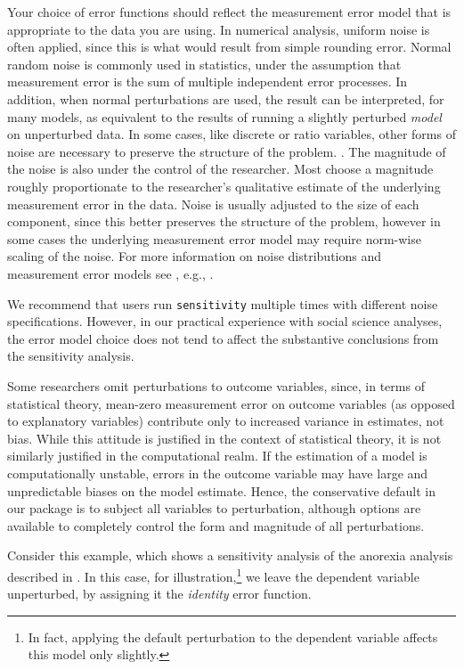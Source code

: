 \documentclass[11pt]{article}
\let\code=\texttt
\begin{document}
Your choice of error functions should reflect the measurement error model that is appropriate to the 
data you are using. In numerical analysis, uniform noise is often applied, since this is what would result from simple rounding error. Normal random noise is commonly used in statistics,
under the assumption that measurement error is the sum of multiple independent error processes. In 
addition, when normal perturbations are used, the result can be interpreted, for many models, as equivalent
to the results of running a slightly perturbed \emph{model} on unperturbed data. In some cases,
like discrete or ratio variables, other forms of noise are necessary to preserve
the structure of the problem. \citep[see, for example][section 16.3]{AltGilMcD03}. 
The magnitude of the noise is also under the control of the researcher. Most
choose a magnitude roughly proportionate to the researcher's qualitative estimate of the underlying measurement error in the data.
Noise is usually adjusted to the size of each component, since this better
preserves the structure of the problem, however in some cases the underlying
measurement error model may require norm-wise scaling of the noise. For more
information on noise distributions and measurement error models see , e.g., 
\citet{Belsley91,ChaiTrav04a,ChengVan99,Fuller87,CarRupStef95}.

We recommend that users run \code{sensitivity} multiple times with different noise specifications.
However, in our practical experience with social science analyses, the error model choice does not tend to affect the substantive conclusions from the sensitivity analysis.

Some researchers omit perturbations to outcome variables, since, in terms of
statistical theory, mean-zero measurement error on outcome variables (as opposed to explanatory variables)
contribute only to increased variance in estimates, not bias. While this attitude is justified 
in the context of statistical theory, it is not similarly justified in the computational realm. If the estimation
of a model is computationally unstable, errors in the outcome variable may have large and unpredictable
 biases on the model estimate. Hence, the conservative default in our package is to subject all variables to perturbation, although options are available to completely control the form and magnitude of all perturbations.

Consider this example, which shows a sensitivity analysis of the anorexia analysis described in \citet{VenRip02}. In this case, for 
	illustration,\footnote{In fact, applying the default perturbation to the dependent 
	variable affects this model only slightly.} 
we leave the dependent variable unperturbed, by assigning it the \emph{identity} error function.
\end{document}
